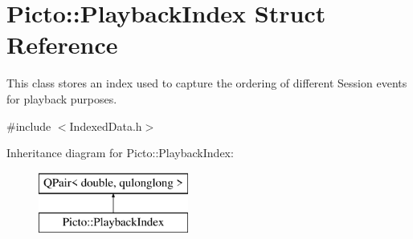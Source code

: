 \hypertarget{struct_picto_1_1_playback_index}{\section{Picto\-:\-:Playback\-Index Struct Reference}
\label{struct_picto_1_1_playback_index}
}


This class stores an index used to capture the ordering of different Session events for playback purposes.  




{\ttfamily \#include $<$Indexed\-Data.\-h$>$}

Inheritance diagram for Picto\-:\-:Playback\-Index\-:\begin{figure}[H]
\begin{center}
\leavevmode
\includegraphics[height=2.000000cm]{struct_picto_1_1_playback_index}
\end{center}
\end{figure}

